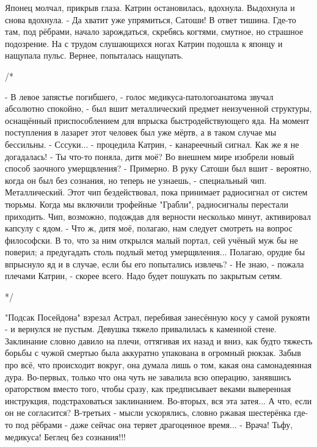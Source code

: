 Японец молчал, прикрыв глаза. Катрин остановилась, вдохнула. Выдохнула и снова вдохнула.
 - Да хватит уже упрямиться, Сатоши!
В ответ тишина. Где-то там, под рёбрами, начало зарождаться, скребясь когтями, смутное, но страшное подозрение. На с трудом слушающихся ногах Катрин подошла к японцу и нащупала пульс.
Вернее, попыталась нащупать.



/*

 - В левое запястье погибшего, - голос медикуса-патологоанатома звучал абсолютно спокойно, - был вшит металлический предмет неизученной структуры, оснащённый приспособлением для впрыска быстродействующего яда. На момент поступления в лазарет этот человек был уже мёртв, а в таком случае мы бессильны.
 - Сссуки... - процедила Катрин, - канареечный сигнал. Как же я не догадалась!
 - Ты что-то поняла, дитя моё? Во внешнем мире изобрели новый способ заочного умерщвления?
 - Примерно. В руку Сатоши был вшит - вероятно, когда он был без сознания, но теперь не узнаешь, - специальный чип. Металлический. Этот чип бездействовал, пока принимает радиосигнал от систем тюрьмы. Когда мы включили трофейные "Грабли", радиосигналы перестали приходить. Чип, возможно, подождав для верности несколько минут, активировал капсулу с ядом.
 - Что ж, дитя моё, полагаю, нам следует смотреть на вопрос философски. В то, что за ним открылся малый портал, сей учёный муж бы не поверил; а предугадать столь подлый метод умерщвления... Полагаю, орудие бы впрыснуло яд и в случае, если бы его попытались извлечь?
 - Не знаю, - пожала плечами Катрин, - скорее всего. Надо будет пошукать по закрытым сетям.

*/

"Подсак Посейдона" взрезал Астрал, перебивая занесённую косу у самой рукояти - и вернулся не пустым.
Девушка тяжело привалилась к каменной стене. Заклинание словно давило на плечи, оттягивая их назад и вниз, как будто тяжесть борьбы с чужой смертью была аккуратно упакована в огромный рюкзак. Забыв про всё, что происходит вокруг, она думала лишь о том, какая она самонадеянная дура. Во-первых, только что она чуть не завалила всю операцию, занявшись ораторством вместо того, чтобы сразу, как предписывает веками выверенная инструкция, подстраховаться заклинанием. Во-вторых, вся эта затея... А что, если он не согласится? В-третьих - мысли ускорялись, словно ржавая шестерёнка где-то под рёбрами - даже сейчас она теряет драгоценное время...
 - Врача! Тьфу, медикуса! Беглец без сознания!!!




